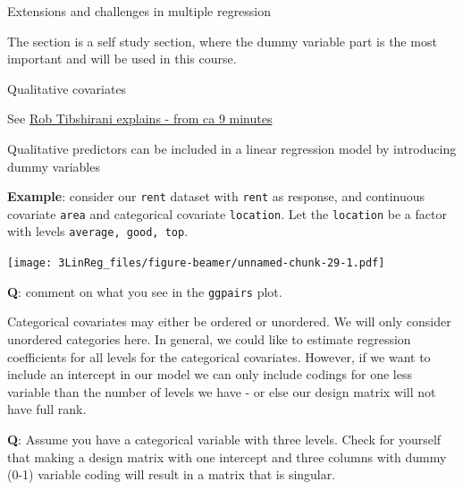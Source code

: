 \documentclass[10pt,ignorenonframetext,]{beamer}
\newenvironment{Shaded}{\begin{snugshade}}{\end{snugshade}}
\newcommand{\KeywordTok}[1]{\textcolor[rgb]{0.13,0.29,0.53}{\textbf{#1}}}
\newcommand{\StringTok}[1]{\textcolor[rgb]{0.31,0.60,0.02}{#1}}
\newcommand{\CommentTok}[1]{\textcolor[rgb]{0.56,0.35,0.01}{\textit{#1}}}
\newcommand{\OperatorTok}[1]{\textcolor[rgb]{0.81,0.36,0.00}{\textbf{#1}}}
\newcommand{\NormalTok}[1]{#1}
\begin{document}
\begin{frame}[fragile]{Extensions and challenges in multiple regression}

The section is a self study section, where the dummy variable part is
the most important and will be used in this course.

\begin{block}{Qualitative covariates}

See
\href{https://www.youtube.com/watch?v=3T6RXmIHbJ4\&index=4\&list=PL5-da3qGB5IBSSCPANhTgrw82ws7w_or9}{Rob
Tibshirani explains - from ca 9 minutes}

Qualitative predictors can be included in a linear regression model by
introducing dummy variables

\textbf{Example}: consider our \texttt{rent} dataset with \texttt{rent}
as response, and continuous covariate \texttt{area} and categorical
covariate \texttt{location}. Let the \texttt{location} be a factor with
levels \texttt{average,\ good,\ top}.

\footnotesize

\begin{Shaded}
\end{Shaded}

\texttt{[image: 3LinReg\_files/figure-beamer/unnamed-chunk-29-1.pdf]}
\normalsize

\textbf{Q}: comment on what you see in the \texttt{ggpairs} plot.

\end{block}

\end{frame}

\begin{frame}

Categorical covariates may either be ordered or unordered. We will only
consider unordered categories here. In general, we could like to
estimate regression coefficients for all levels for the categorical
covariates. However, if we want to include an intercept in our model we
can only include codings for one less variable than the number of levels
we have - or else our design matrix will not have full rank.

\textbf{Q}: Assume you have a categorical variable with three levels.
Check for yourself that making a design matrix with one intercept and
three columns with dummy (0-1) variable coding will result in a matrix
that is singular.

\end{frame}
\end{document}
